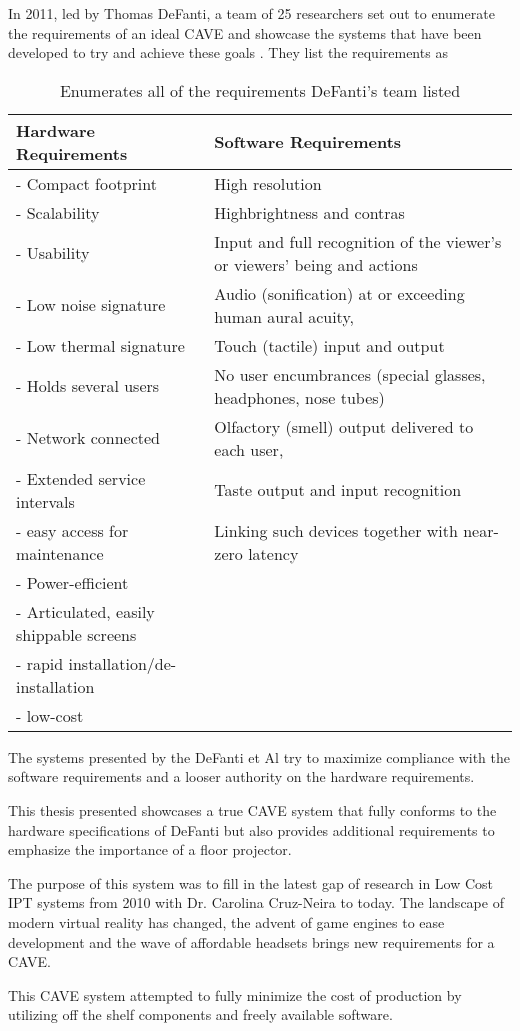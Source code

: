 \label{chapter:conclusionChapter}



In 2011, led by Thomas DeFanti, a team of 25 researchers set out to enumerate the requirements of an ideal CAVE and showcase the systems that have been developed to try and achieve these goals 
\noindent\cite{defanti-future-cave}. They list the  requirements as 


\begin{table}[H]
	\centering
	\renewcommand\arraystretch{0.5}
	\begin{tabular}{l | l}
		Hardware Requirements &  Software Requirements\\ 
		\hline
		- Compact footprint &  High resolution \\ 
		- Scalability &  Highbrightness and contras\\ 
		- Usability &  Input and full recognition of the viewer’s or viewers’ being and actions \\ 
		- Low noise signature & Audio (sonification) at or exceeding human aural acuity,   \\ 
		- Low thermal signature &  Touch (tactile) input and output\\ 
		- Holds several users  & No user encumbrances (special glasses, headphones, nose tubes)\\ 
		- Network connected & Olfactory (smell) output delivered to each user, \\ 
		- Extended service intervals &  Taste output and input recognition \\
		- easy access for maintenance &  Linking such devices together with near-zero latency\\ 
		- Power-efficient &  \\ 
		- Articulated, easily shippable screens &  \\ 
		- rapid installation/de-installation &   \\ 	
		- low-cost  &   \\ 
	\end{tabular} 

	\label{tbl:defantirequirements}
	\caption{Enumerates all of the requirements DeFanti's team listed}
\end{table}

The systems presented by the DeFanti et Al try to maximize compliance with the software requirements and a looser authority on the hardware requirements. 

This thesis presented showcases a true CAVE system that fully conforms to the hardware specifications of DeFanti \cite{defanti-future-cave} but also provides additional requirements to emphasize the importance of a floor projector. 

The purpose of this system was to fill in the latest gap of research in Low Cost IPT systems  from 2010 with Dr. Carolina Cruz-Neira to today. The landscape of modern virtual reality has changed, the advent of game engines to ease development and the wave of affordable headsets brings new requirements for a CAVE.

This CAVE system attempted to fully minimize the cost of production by utilizing off the shelf components and freely available software. 



\clearpage
